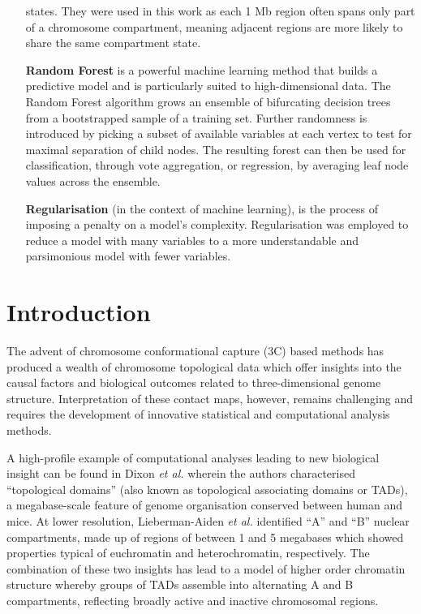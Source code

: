 \documentclass[a4paper]{report}
\begin{document}
\begin{itemize}
  states. They were used in this work as each 1 Mb region often spans only
  part of a chromosome compartment, meaning adjacent regions are more
  likely to share the same compartment state.
\item[{\bf Random Forest}] is a powerful machine learning method that
  builds a predictive model and is particularly suited to high-dimensional data.
 The Random Forest algorithm grows an
  ensemble of bifurcating decision trees from a bootstrapped sample of
  a training set. Further randomness is introduced by picking a subset
  of available variables at each vertex to test for maximal separation
  of child nodes. The resulting forest can then be used for
  classification, through vote aggregation, or regression, by averaging
  leaf node values across the ensemble.
\item[{\bf Regularisation}] (in the context of machine learning), is the process of
  imposing a penalty on a
  model's complexity. Regularisation was employed to reduce a model
  with many variables to a more understandable and parsimonious model
  with fewer variables.
\end{itemize}


\chapter{Introduction}
The advent of chromosome conformational capture
(3C) based methods has produced a wealth of chromosome topological data
which offer insights into the causal factors and biological
outcomes related to three-dimensional genome structure. Interpretation
of these contact maps, however, remains challenging and requires the
development of
innovative statistical and computational analysis
methods.\cite{Dekker2013, Steffen2012, Hu2013} 

A high-profile example of computational analyses leading to new
biological insight can be found in Dixon \emph{et al.}\cite{Dixon2012}
wherein the authors characterised ``topological domains'' (also known
as topological associating domains or TADs), a
megabase-scale feature of genome organisation conserved between human
and mice. At lower resolution, Lieberman-Aiden \emph{et
  al.}\cite{Lieberman2011} identified ``A'' and ``B'' nuclear compartments,
made up of regions of between 1 and 5 megabases which showed properties typical
of euchromatin and heterochromatin, respectively. The combination
of these two insights has lead to a model of higher order chromatin
structure whereby groups of TADs assemble into alternating A and B
compartments, reflecting broadly active and inactive chromosomal
regions.\cite{Dekker2013} 
\end{document}
